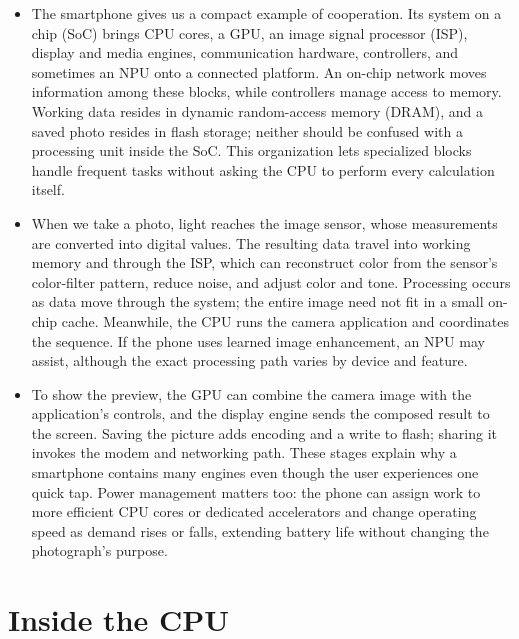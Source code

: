 \documentclass[10pt]{article}
\begin{document}
\begin{itemize}[leftmargin=1.25em, itemsep=0.3em, parsep=0pt, topsep=0pt]
    \item The smartphone gives us a compact example of cooperation. Its system on a chip (SoC) brings CPU cores, a GPU, an image signal processor (ISP), display and media engines, communication hardware, controllers, and sometimes an NPU onto a connected platform. An on-chip network moves information among these blocks, while controllers manage access to memory. Working data resides in dynamic random-access memory (DRAM), and a saved photo resides in flash storage; neither should be confused with a processing unit inside the SoC. This organization lets specialized blocks handle frequent tasks without asking the CPU to perform every calculation itself.

    \item When we take a photo, light reaches the image sensor, whose measurements are converted into digital values. The resulting data travel into working memory and through the ISP, which can reconstruct color from the sensor's color-filter pattern, reduce noise, and adjust color and tone. Processing occurs as data move through the system; the entire image need not fit in a small on-chip cache. Meanwhile, the CPU runs the camera application and coordinates the sequence. If the phone uses learned image enhancement, an NPU may assist, although the exact processing path varies by device and feature.

    \item To show the preview, the GPU can combine the camera image with the application's controls, and the display engine sends the composed result to the screen. Saving the picture adds encoding and a write to flash; sharing it invokes the modem and networking path. These stages explain why a smartphone contains many engines even though the user experiences one quick tap. Power management matters too: the phone can assign work to more efficient CPU cores or dedicated accelerators and change operating speed as demand rises or falls, extending battery life without changing the photograph's purpose.
\end{itemize}

\newpage
\section*{Inside the CPU}
\end{document}
